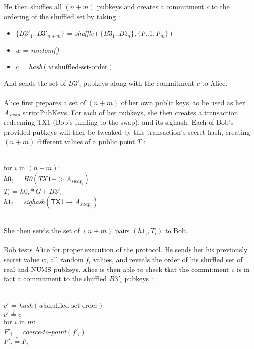 \documentclass[12pt,a4paper]{article}
\begin{document}
He then shuffles all $(n+m)$ pubkeys and creates a commitment $c$ to the ordering of the shuffled set by taking :
\begin{footnotesize}
\begin{itemize}
\item $\{B3'_1..B3'_{n+m}\}$ = \emph{shuffle}$( \{B3_1..B3_n\}, \{F..1, F_m\} )$
\item $w$ = \emph{random()}
\item $c$ = \emph{hash}$(w \texttt{|} \text{shuffled-set-order})$
\end{itemize}
\end{footnotesize}
And sends the set of $B3'_i$ pubkeys along with the commitment $c$ to Alice. \\ \\
Alice first prepares a set of $(n+m)$ of her own public keys, to be used as her $A_{swap}$ scriptPubKeys.  For each of her pubkeys, she then creates a transaction redeeming \textsf{TX1} (Bob's funding to the swap), and its sighash.  Each of Bob's provided pubkeys will then be tweaked by this transaction's secret hash, creating $(n+m)$ different values of a public point $T$ : \\ \\
\begin{footnotesize}
for $i$ in $(n+m)$: \\
    \indent $h0_i$ = \emph{H0}$(TX1->A_{swap_i})$ \\
    \indent $T_i$ = $h0_i*G + B3'_i$ \\
    \indent $h1_i$ = \emph{sighash}$(\textsf{TX1} \rightarrow A_{swap_i})$ \\
\end{footnotesize}
\\
She then sends the set of $(n+m)$ pairs $(h1_i, T_i)$ to Bob. \\ \\
Bob tests Alice for proper execution of the protocol.  He sends her his previously secret value $w$, all random $f_i$ values, and reveals the order of his shuffled set of real and NUMS pubkeys.  Alice is then able to check that the commitment $c$ is in fact a commitment to the shuffled $B3'_i$ pubkeys : \\ \\
\begin{footnotesize}
$c'$ = \emph{hash}$( w \texttt{|} \text{shuffled-set-order})$ \\
$c' \stackrel{?}{=} c$ \\
for $i$ in $m$: \\
    \indent $F'_i$ = \emph{coerce-to-point}$(f'_i)$ \\
    \indent $F'_i \stackrel{?}{=} F_i$ \\
\end{footnotesize} \\ \\ \\
\end{document}

